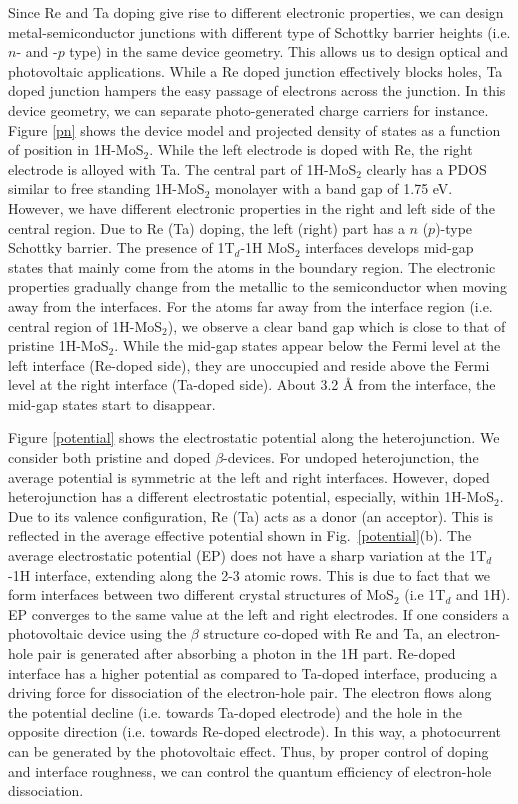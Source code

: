 Since Re and Ta doping give rise to different electronic properties, we can design metal-semiconductor
junctions with different type of Schottky barrier heights (i.e. $n$- and -$p$ type) in the same device geometry. This allows us to design 
optical and photovoltaic applications. While a Re doped junction effectively blocks holes, Ta doped junction hampers the easy passage of electrons across the junction. In this device geometry, we can separate  photo-generated charge carriers for instance. Figure \ref{pn} shows the device model and projected density of states as a function of position in 1H-MoS$_2$. While the left electrode is doped with Re, the right electrode is alloyed with Ta.  The central part of 1H-MoS$_2$ clearly has a PDOS similar to free standing 1H-MoS$_2$ monolayer with a band gap of 1.75 eV.  However, we have different electronic properties in the right and left side of the central region.
Due to Re (Ta) doping, the left (right) part has a $n$ ($p$)-type Schottky barrier.  
The presence of 1T$_d$-1H MoS$_2$ interfaces develops mid-gap states that mainly come from the atoms in the
boundary region. The electronic properties gradually change from the metallic to the semiconductor when moving away from the interfaces.  For the atoms far away from the interface region (i.e. central region of 1H-MoS$_2$), we observe a clear band gap which is close to that of pristine 1H-MoS$_2$. While the mid-gap states appear below the Fermi level at the left interface (Re-doped side), they are unoccupied and reside above the Fermi level at the right interface (Ta-doped side).  About 3.2 {\AA} from the interface, the mid-gap states start to disappear.  

Figure \ref{potential} shows the electrostatic potential along the heterojunction. We consider both pristine and doped $\beta$-devices. 
For undoped heterojunction, the average potential is symmetric at the left and right interfaces.
However, doped heterojunction has a  different electrostatic potential, especially, within 1H-MoS$_2$. 
Due to its valence configuration, Re (Ta) acts as a donor (an acceptor). 
This is reflected in the average effective potential shown in Fig.~\ref{potential}(b).
The average electrostatic potential (EP) does not have a sharp variation at the 1T$_d$-1H interface, extending along the 2-3 atomic rows.  
This is due to fact that we form interfaces between two different crystal structures of MoS$_2$ (i.e 1T$_d$ and 1H). EP converges to  the same value at the left and right electrodes. 
If one considers a photovoltaic device using the  $\beta$ structure co-doped with Re and Ta, 
an electron-hole pair is generated after absorbing a photon in the 1H part. 
Re-doped interface has a higher potential as compared to Ta-doped interface, producing a driving force for dissociation of the electron-hole pair. 
The electron flows along the potential decline (i.e. towards Ta-doped electrode)
and the hole in the opposite direction (i.e. towards Re-doped electrode).
In this way,  a photocurrent can be  generated by the photovoltaic effect. Thus, by proper control of doping and interface roughness, we 
can control the quantum efficiency of electron-hole dissociation\cite{doi:10.1021/acs.jpclett.7b00518}. 

